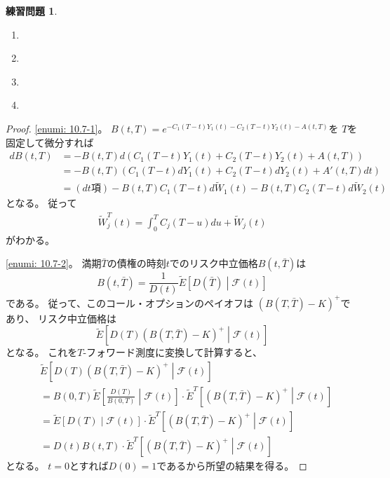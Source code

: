 \documentclass[uplatex]{jsarticle}
\theoremstyle{definition}
\newtheorem{prob}[prob]{練習問題}
\def\mcF{\mathcal{F}}
\begin{document}
\begin{prob}\label{prob: 10.7}
  \begin{enumerate}
    \item \label{enumi: 10.7-1}
    \item \label{enumi: 10.7-2}
    \item \label{enumi: 10.7-3}
    \item \label{enumi: 10.7-4}
  \end{enumerate}
\end{prob}

\begin{proof}
  \ref{enumi: 10.7-1}。
  \(B(t,T) = e^{-C_1(T-t)Y_1(t)-C_2(T-t)Y_2(t)-A(t,T)}\)を
  \(T\)を固定して微分すれば
  \begin{align*}
    dB(t,T)
    &= -B(t,T)d(C_1(T-t)Y_1(t) + C_2(T-t)Y_2(t) + A(t,T)) \\
    &= -B(t,T)(C_1(T-t)dY_1(t) + C_2(T-t)dY_2(t) + A'(t,T)dt) \\
    &= (\text{\(dt\)項})
    - B(t,T)C_1(T-t)d\tilde{W}_1(t)
    - B(t,T)C_2(T-t)d\tilde{W}_2(t)
  \end{align*}
  となる。
  従って
  \begin{align*}
    \tilde{W}_j^T(t) = \int_0^TC_j(T-u)du + \tilde{W}_j(t)
  \end{align*}
  がわかる。

  \ref{enumi: 10.7-2}。
  満期\(\bar{T}\)の債権の時刻\(t\)でのリスク中立価格\(B(t,\bar{T})\)は
  \[
  B(t,\bar{T}) =
  \frac{1}{D(t)}\tilde{E}\left[ D(\bar{T})\middle| \mcF(t)\right]
  \]
  である。
  従って、このコール・オプションのペイオフは
  \(\left( B(T,\bar{T}) - K \right)^+\)であり、
  リスク中立価格は
  \[
  \tilde{E}\left[ D(T)\left( B(T,\bar{T}) - K \right)^+\middle| \mcF(t)\right]
  \]
  となる。
  これを\(T\)-フォワード測度に変換して計算すると、
  \begin{align*}
    &\tilde{E}\left[ D(T)\left( B(T,\bar{T}) - K \right)^+
    \middle| \mcF(t)\right] \\
    &= B(0,T)\tilde{E}\left[ \frac{D(T)}{B(0,T)}\middle| \mcF(t)\right]
    \cdot \tilde{E}^T\left[\left( B(T,\bar{T}) - K \right)^+
    \middle| \mcF(t)\right] \\
    &= \tilde{E}\left[ D(T)\middle| \mcF(t)\right]
    \cdot \tilde{E}^T\left[\left( B(T,\bar{T}) - K \right)^+
    \middle| \mcF(t)\right] \\
    &= D(t)B(t,T)
    \cdot \tilde{E}^T\left[\left( B(T,\bar{T}) - K \right)^+
    \middle| \mcF(t)\right]
  \end{align*}
  となる。
  \(t=0\)とすれば\(D(0)=1\)であるから所望の結果を得る。


\end{proof}
\end{document}
